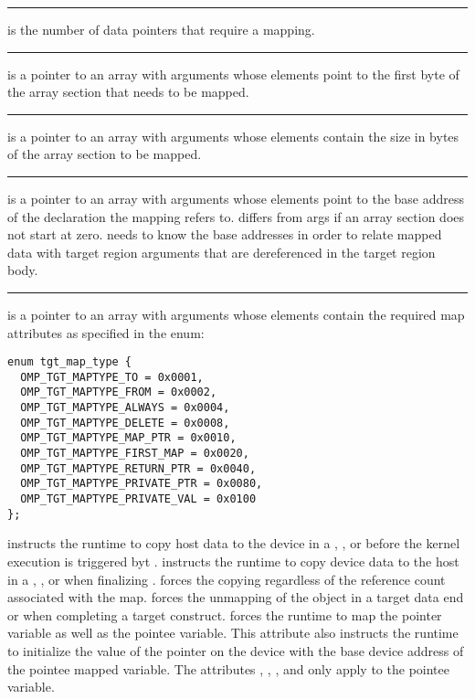 \noindent\rule{\textwidth}{0.4pt}

 is the number of data pointers that require a mapping.

\noindent\rule{\textwidth}{0.4pt}

 is a pointer to an array with  arguments whose elements point to the first byte of the array section that needs to be mapped.

\noindent\rule{\textwidth}{0.4pt}

 is a pointer to an array with  arguments whose elements contain the size in bytes of the array section to be mapped.

\noindent\rule{\textwidth}{0.4pt}

 is a pointer to an array with  arguments whose elements point to the base address of the declaration the mapping refers to.  differs from args if an array section does not start at zero. \libomptarget{} needs to know the base addresses in order to relate mapped data with target region arguments that are dereferenced in the target region body.

\noindent\rule{\textwidth}{0.4pt}

 is a pointer to an array with  arguments whose elements contain the required map attributes as specified in the enum:
\begin{lstlisting}
enum tgt_map_type {
  OMP_TGT_MAPTYPE_TO = 0x0001,
  OMP_TGT_MAPTYPE_FROM = 0x0002,
  OMP_TGT_MAPTYPE_ALWAYS = 0x0004,
  OMP_TGT_MAPTYPE_DELETE = 0x0008,
  OMP_TGT_MAPTYPE_MAP_PTR = 0x0010,
  OMP_TGT_MAPTYPE_FIRST_MAP = 0x0020,
  OMP_TGT_MAPTYPE_RETURN_PTR = 0x0040,
  OMP_TGT_MAPTYPE_PRIVATE_PTR = 0x0080,
  OMP_TGT_MAPTYPE_PRIVATE_VAL = 0x0100
};
\end{lstlisting}

\sloppy
{} instructs the runtime to copy host data to the device in a , , or before the kernel execution is triggered byt .   instructs the runtime to copy  device data to the host in a , , or when finalizing .   forces the copying regardless of the reference count associated with the map.    forces the unmapping of the object in a target data end or when completing a target construct.  forces the runtime to map the pointer variable as well as the pointee variable. This attribute also instructs the runtime to initialize the value of the pointer on the device with the base device address of the pointee mapped variable. The attributes , , , and  only apply to the pointee variable. 

